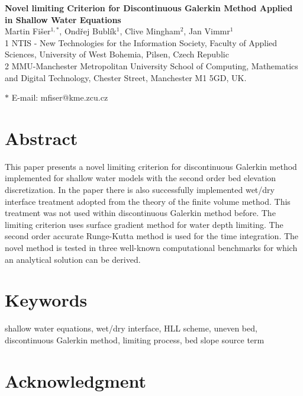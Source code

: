 \documentclass[12pt]{article}
\date{}
\begin{document}
\begin{flushleft}
{\Large
\textbf{Novel limiting Criterion for Discontinuous Galerkin Method Applied in Shallow Water Equations}
}
\\
Martin Fi\v{s}er$^{1,\ast}$,
Ondřej Bublík$^{1}$,
Clive Mingham$^{2}$,
Jan Vimmr$^{1}$
\\
1 NTIS - New Technologies for the Information Society, Faculty of Applied Sciences,
University of West Bohemia, Pilsen, Czech Republic
\\
2 MMU-Manchester Metropolitan University
School of Computing, Mathematics and Digital Technology,
Chester Street, Manchester M1 5GD, UK.

$\ast$ E-mail: mfiser@kme.zcu.cz
\end{flushleft}


\section*{Abstract} 

This paper presents a novel limiting criterion for discontinuous Galerkin method implemented for shallow water models with the second order bed elevation discretization. In the paper there is also successfully implemented wet/dry interface treatment adopted from the theory of the finite volume method. This treatment was not used within discontinuous Galerkin method before. The limiting criterion uses surface gradient method for water depth limiting. The second order accurate Runge-Kutta method is used for the time integration. The novel method is tested in three well-known computational benchmarks for which an analytical solution can be derived. 

\section*{Keywords}

shallow water equations, wet/dry interface, HLL scheme, 
uneven bed, discontinuous Galerkin method, limiting process, bed slope source term






%


\section*{Acknowledgment}


{}
\end{document}
